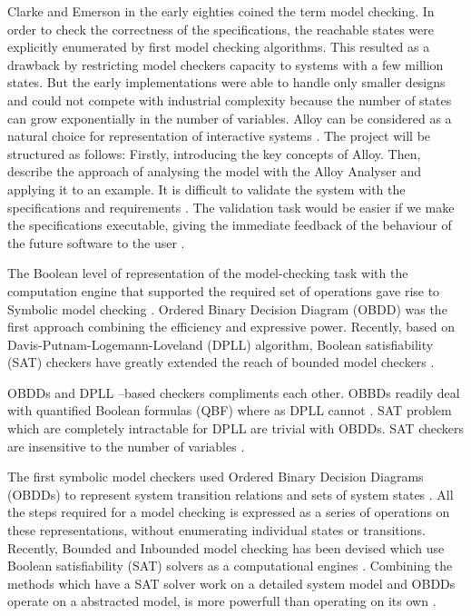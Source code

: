 \documentclass[a4paper,12pt]{report}
\begin{document}
Clarke and Emerson in the early eighties coined the term model checking. In order to check the correctness of the specifications, the reachable states were explicitly enumerated by first model checking algorithms. This resulted as a drawback by restricting model checkers capacity to systems with a few million states. But the early implementations were able to handle only smaller designs and could not compete with industrial complexity because the number of states can grow exponentially in the number of variables. Alloy can be considered as a natural choice for representation of interactive systems \cite{A.Blandford2000}. The project will be structured as follows:
Firstly, introducing the key concepts of Alloy. Then, describe the approach of analysing the model with the Alloy Analyser and applying it to an example. It is difficult to validate the system with the specifications and requirements \cite{RussellBoyatt}. The validation task would be easier if we make the specifications executable, giving the immediate feedback of the behaviour of the future software to the user \cite{RussellBoyatt}.

The Boolean level of representation of the model-checking task with the computation engine that supported the required set of operations gave rise to Symbolic model checking \cite{R.Bryant1986}. Ordered Binary Decision Diagram (OBDD) was the first approach combining the efficiency and expressive power. Recently, based on Davis-Putnam-Logemann-Loveland (DPLL) algorithm, Boolean satisfiability (SAT) checkers have greatly extended the reach of bounded model checkers \cite{R.Bryant1986}.

OBDDs and DPLL –based checkers compliments each other. OBBDs readily deal with quantified Boolean formulas (QBF) where as DPLL cannot \cite{R.Bryant1986}. SAT problem which are completely intractable for DPLL are trivial with OBDDs. SAT checkers are insensitive to the number of variables \cite{O.Strichman}.

The first symbolic model checkers used Ordered Binary Decision Diagrams (OBDDs) \cite{R.Bryant1986} to represent system transition relations and sets of system states \cite{McMillan1992} . All the steps required for a model checking is expressed as a series of operations on these representations, without enumerating individual states or transitions. Recently, Bounded and Inbounded model checking has been devised which use Boolean satisfiability (SAT) solvers as a computational engines \cite{McMillan1992}. Combining the methods which have a SAT solver work on a detailed system model and OBDDs operate on a abstracted model, is more powerfull than operating on its own \cite{Clarke1999}.
\end{document}
